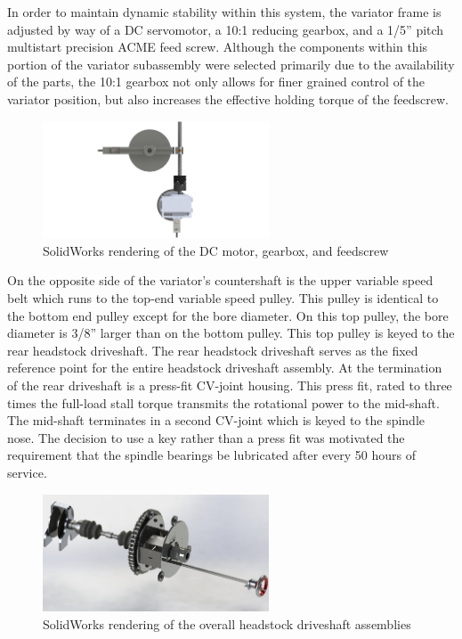 In order to maintain dynamic stability within this system, the variator frame is adjusted by way of a DC servomotor, a 10:1 reducing gearbox, and a 1/5” pitch multistart precision ACME feed screw. Although the components within this portion of the variator subassembly were selected primarily due to the availability of the parts, the 10:1 gearbox not only allows for finer grained control of the variator position, but also increases the effective holding torque of the feedscrew. 

\begin{figure}[H]
    \centering
    \includegraphics[width=0.6\textwidth]{./fall-report pictures/Chapter2-MachineDescription/DCGF}
    \caption{SolidWorks rendering of the DC motor, gearbox, and feedscrew}
    \label{fig:DCGF}
\end{figure}

On the opposite side of the variator’s countershaft is the upper variable speed belt which runs to the top-end variable speed pulley. This pulley is identical to the bottom end pulley except for the bore diameter. On this top pulley, the bore diameter is 3/8” larger than on the bottom pulley. This top pulley is keyed to the rear headstock driveshaft. The rear headstock driveshaft serves as the fixed reference point for the entire headstock driveshaft assembly. At the termination of the rear driveshaft is a press-fit CV-joint housing. This press fit, rated to three times the full-load stall torque transmits the rotational power to the mid-shaft. The mid-shaft terminates in a second CV-joint which is keyed to the spindle nose. The decision to use a key rather than a press fit was motivated the requirement that the spindle bearings be lubricated after every 50 hours of service. 

\begin{figure}[H]
    \centering
    \includegraphics[width=0.6\textwidth]{./fall-report pictures/Chapter2-MachineDescription/HD}
    \caption{SolidWorks rendering of the overall headstock driveshaft assemblies}
    \label{fig:HD}
\end{figure}

